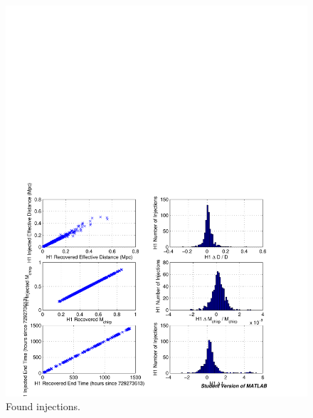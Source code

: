 \begin{figure}[p]
\begin{center}
\includegraphics[width=\textwidth]{analysis/figures/h1_param_error}
\end{center}
\caption{\label{f:pipeline}%
Found injections.
}
\end{figure}


